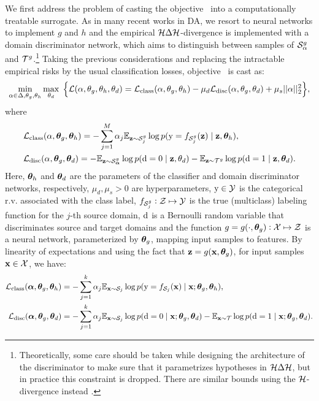 We first address the problem of casting the objective~ into a computationally treatable surrogate. As in many recent works in DA, we resort to neural networks to implement $g$ and $h$ and the empirical ${\mathcal{H}} \Delta {\mathcal{H}}$-divergence is implemented with a domain discriminator network, which aims to distinguish between samples of ${\mathcal{S}}_\alpha^g$ and ${\mathcal{T}}^g$.\footnote[1]{Theoretically, some care should be taken while designing the architecture of the discriminator to make sure that it parametrizes hypotheses in ${\mathcal{H}} \Delta {\mathcal{H}}$, but in practice this constraint is dropped. There are similar bounds using the ${\mathcal{H}}$-divergence instead \citep{Sebag2019}.} Taking the previous considerations and replacing the intractable empirical risks by the usual classification losses, objective~ is cast as:
\begin{equation}
\min_{\alpha \in \Delta, \theta_g, \theta_h} \max_{\theta_d} \; \Big\{ {\mathcal{L}}(\alpha, \theta_g, \theta_h, \theta_d) = {\mathcal{L}}_\text{class}(\alpha, \theta_g, \theta_h) - \mu_d {\mathcal{L}}_\text{disc}(\alpha, \theta_g, \theta_d) + \mu_s ||\alpha||_2^2 \Big\},
\end{equation}
where 
\begin{align}
&\gL_\text{class}(\alpha, \vtheta_g, \vtheta_h) = -\sum_{j=1}^M \alpha_j\E_{\rvz \sim \gS_j^g}\log p(\ry=f_{\gS_j^g}(\rvz) \mid \rvz, \vtheta_h), \\
%
&\gL_\text{disc}(\alpha, \vtheta_g, \vtheta_d) = -\E_{\rvz \sim \gS_{\valpha}^g} \log p(\rd=0 \mid \rvz, \theta_d) - \E_{\rvz \sim \gT^g} \log p(\rd=1 \mid \rvz, \vtheta_d).
\end{align}
Here, ${\bm{\theta}}_h$ and ${\bm{\theta}}_d$ are the parameters of the classifier and domain discriminator networks, respectively, $\mu_d, \mu_s > 0$ are hyperparameters, ${\textnormal{y}} \in {\mathcal{Y}}$ is the categorical r.v. associated with the class label, $f_{{\mathcal{S}}_j^g}: {\mathcal{Z}} \mapsto {\mathcal{Y}}$ is the true (multiclass) labeling function for the $j$-th source domain, ${\textnormal{d}}$ is a Bernoulli random variable that discriminates source and target domains and the function $g = g(\cdot, {\bm{\theta}}_g): {\mathcal{X}} \mapsto {\mathcal{Z}}$ is a neural network, parameterized by ${\bm{\theta}}_g$, mapping input samples to features. By linearity of expectations and using the fact that ${\mathbf{z}} = g({\mathbf{x}}, {\bm{\theta}}_g)$, for input samples ${\mathbf{x}} \in {\mathcal{X}}$, we have:
\begin{align}
\label{eq:loss_class}
\gL_\text{class}(\valpha, \vtheta_g, \vtheta_h) &= -\sum_{j=1}^k \alpha_j\E_{\rvx \sim \gS_j} \log p(\ry=f_{\gS_j}(\rvx) \mid \rvx; \vtheta_g, \vtheta_h), \\
\allowdisplaybreaks
\label{eq:loss_disc}
\gL_\text{disc}(\valpha, \vtheta_g, \vtheta_d) &= -\sum_{j=1}^k \alpha_j\E_{\rvx \sim \gS_j} \log p(\rd=0 \mid \rvx; \vtheta_g, \vtheta_d)  - \E_{\rvx \sim \gT} \log p(\rd=1 \mid \rvx; \vtheta_g, \vtheta_d) .
\end{align}
